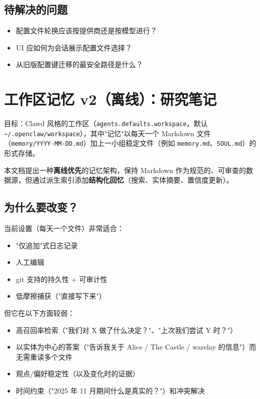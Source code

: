 \subsection{待解决的问题}


\begin{itemize}
  \item 配置文件轮换应该按提供商还是按模型进行？
  \item UI 应如何为会话展示配置文件选择？
  \item 从旧版配置键迁移的最安全路径是什么？
\end{itemize}



\clearpage

\section{工作区记忆 v2（离线）：研究笔记}


目标：Clawd 风格的工作区（\texttt{agents.defaults.workspace}，默认 \texttt{\textasciitilde{}/.openclaw/workspace}），其中"记忆"以每天一个 Markdown 文件（\texttt{memory/YYYY-MM-DD.md}）加上一小组稳定文件（例如 \texttt{memory.md}、\texttt{SOUL.md}）的形式存储。

本文档提出一种\textbf{离线优先}的记忆架构，保持 Markdown 作为规范的、可审查的数据源，但通过派生索引添加\textbf{结构化回忆}（搜索、实体摘要、置信度更新）。

\subsection{为什么要改变？}


当前设置（每天一个文件）非常适合：

\begin{itemize}
  \item "仅追加"式日志记录
  \item 人工编辑
  \item git 支持的持久性 + 可审计性
  \item 低摩擦捕获（"直接写下来"）
\end{itemize}


但它在以下方面较弱：

\begin{itemize}
  \item 高召回率检索（"我们对 X 做了什么决定？"、"上次我们尝试 Y 时？"）
  \item 以实体为中心的答案（"告诉我关于 Alice / The Castle / warelay 的信息"）而无需重读多个文件
  \item 观点/偏好稳定性（以及变化时的证据）
  \item 时间约束（"2025 年 11 月期间什么是真实的？"）和冲突解决
\end{itemize}


